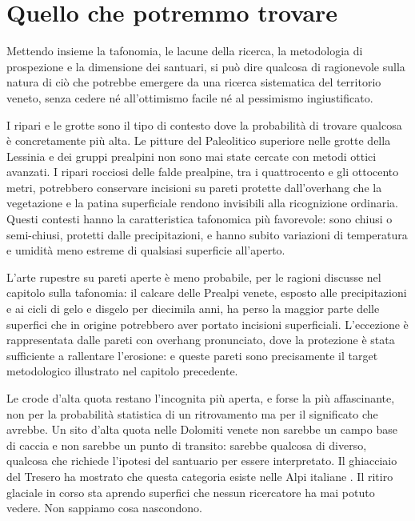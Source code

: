 \section{Quello che potremmo trovare}

Mettendo insieme la tafonomia, le lacune della ricerca, la metodologia di prospezione e la dimensione dei santuari, si può dire qualcosa di ragionevole sulla natura di ciò che potrebbe emergere da una ricerca sistematica del territorio veneto, senza cedere né all'ottimismo facile né al pessimismo ingiustificato.

I ripari e le grotte sono il tipo di contesto dove la probabilità di trovare qualcosa è concretamente più alta. Le pitture del Paleolitico superiore nelle grotte della Lessinia e dei gruppi prealpini non sono mai state cercate con metodi ottici avanzati. I ripari rocciosi delle falde prealpine, tra i quattrocento e gli ottocento metri, potrebbero conservare incisioni su pareti protette dall'overhang che la vegetazione e la patina superficiale rendono invisibili alla ricognizione ordinaria. Questi contesti hanno la caratteristica tafonomica più favorevole: sono chiusi o semi-chiusi, protetti dalle precipitazioni, e hanno subito variazioni di temperatura e umidità meno estreme di qualsiasi superficie all'aperto.

L'arte rupestre su pareti aperte è meno probabile, per le ragioni discusse nel capitolo sulla tafonomia: il calcare delle Prealpi venete, esposto alle precipitazioni e ai cicli di gelo e disgelo per diecimila anni, ha perso la maggior parte delle superfici che in origine potrebbero aver portato incisioni superficiali. L'eccezione è rappresentata dalle pareti con overhang pronunciato, dove la protezione è stata sufficiente a rallentare l'erosione: e queste pareti sono precisamente il target metodologico illustrato nel capitolo precedente.

Le crode d'alta quota restano l'incognita più aperta, e forse la più affascinante, non per la probabilità statistica di un ritrovamento ma per il significato che avrebbe. Un sito d'alta quota nelle Dolomiti venete non sarebbe un campo base di caccia e non sarebbe un punto di transito: sarebbe qualcosa di diverso, qualcosa che richiede l'ipotesi del santuario per essere interpretato. Il ghiacciaio del Tresero ha mostrato che questa categoria esiste nelle Alpi italiane \citep{tresero2024}. Il ritiro glaciale in corso sta aprendo superfici che nessun ricercatore ha mai potuto vedere. Non sappiamo cosa nascondono.

